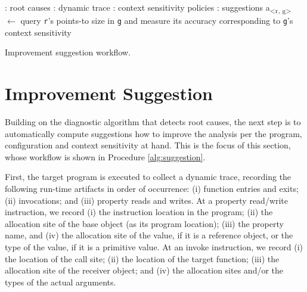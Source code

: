 \begin{algorithm}[th!]
	\begin{algorithmic}[1]
		\renewcommand{\algorithmicrequire}{\textbf{Input:}}
		\renewcommand{\algorithmicensure}{\textbf{Output:}}
		: root causes
		: dynamic trace
		: context sensitivity policies
		: suggestions
		\ENDFOR
		\STATE a\textsubscript{<r, g>} $\leftarrow$ query {\tt r}'s points-to size in {\tt g} and measure its accuracy corresponding to {\tt g}'s context sensitivity
		\ENDFOR
		\ENDFOR
	\end{algorithmic}
	\caption{Improvement suggestion workflow.}
	\label{alg:suggestion}
\end{algorithm}

\section{Improvement Suggestion}
\label{Se:suggestion}

Building on the diagnostic algorithm that detects root causes, the next 
step is to automatically compute suggestions how to improve the analysis per the program, configuration and context sensitivity at hand. This is the focus of this section, whose workflow is shown in Procedure \ref{alg:suggestion}.

First, the target program is executed to collect a dynamic trace, recording the following run-time artifacts in order of occurrence: (i) function entries and exits; (ii) invocations; and (iii) property reads and writes. At a property read/write instruction, we record (i) the instruction location in the program; (ii) the allocation site of the base object (as its program location); (iii) the property name, and (iv) the allocation site of the value, if it is a reference object, or the type of the value, if it is a primitive value. At an invoke instruction, we record (i) the location of the call site; (ii) the location of the target function; (iii) the allocation site of the receiver object; and (iv) the allocation sites and/or the types of the actual arguments. 

